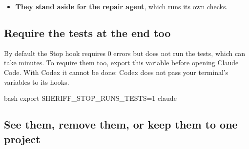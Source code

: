 \documentclass[11pt,a4paper]{article}
\begin{document}
\begin{itemize}
\begin{command}[basicstyle=\ttfamily\footnotesize]{answer}
Next step: put each line back to its value before the arrow; committing it does not
keep it. If the user asked for one of these changes, make it with the sheriff_config
tool, which they approve; written any other way it is sent back again.
\end{command}
        A change made with the settings page, or by asking the assistant
        (, which you approve), is yours and is not sent
        back. So is whatever you change between turns, by hand or with
        , committed or not: the next turn starts from it. During
        a turn,  counts as an edit by hand, as the
        assistant's shell could run it too. If the assistant stops without
        putting a line back, the hook tells it to tell you first, and every later turn is sent back
        over that line until it is put back or made with .
  \item \textbf{They stand aside for the repair agent}, which runs its own
        checks.
\end{itemize}

\subsection{Require the tests at the end too}

By default the Stop hook requires 0 errors but does not run the tests, which can
take minutes. To require them too, export this variable before opening Claude
Code. With Codex it cannot be done: Codex does not pass your terminal's
variables to its hooks.

\begin{command}{bash}
export SHERIFF_STOP_RUNS_TESTS=1
claude
\end{command}

\subsection{See them, remove them, or keep them to one project}
\end{document}
